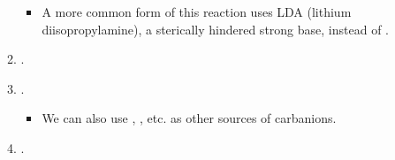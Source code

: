 \documentclass[../notes.tex]{subfiles}
\begin{document}
\begin{itemize}
\begin{enumerate}
        \begin{itemize}
            \item A more common form of this reaction uses LDA (lithium diisopropylamine), a sterically hindered strong base, instead of .
        \end{itemize}
        \item {}.
        \item {}.
        \begin{itemize}
            \item We can also use , , etc. as other sources of carbanions.
        \end{itemize}
        \item {}.
    \end{enumerate}
\end{itemize}
\end{document}
